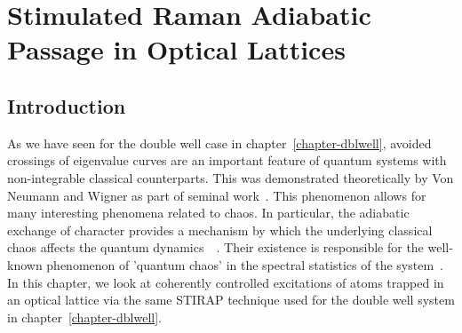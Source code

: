   \chapter{Stimulated Raman Adiabatic Passage in Optical Lattices}
%
\label{chapter-optical_lattice}
\section{\label{sec:1} Introduction}
As we have seen for the double well case in chapter~\ref{chapter-dblwell}, avoided crossings of eigenvalue curves are an important feature of quantum systems with non-integrable classical counterparts. This was demonstrated theoretically by Von Neumann and Wigner as part of seminal work~\cite{von-Neumann:Wigner}. This phenomenon allows for many interesting phenomena related to chaos. In particular, the adiabatic exchange of character provides a mechanism by which the underlying classical chaos affects the quantum dynamics~\cite{na-reichl:pbox}~\cite{mypaper}. Their existence is responsible for the well-known phenomenon of 'quantum chaos' in the spectral statistics of the system~\cite{reichl}. In this chapter, we look at coherently controlled excitations of atoms trapped in an optical lattice via the same STIRAP technique used for the double well system in chapter~\ref{chapter-dblwell}. 


